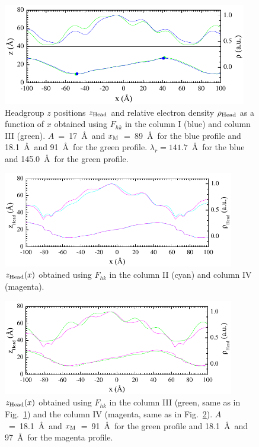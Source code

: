 \begin{figure}[htbp]
  \centering
  \includegraphics[width=0.95\textwidth]{figures/ripple/LAXS/low-res_comparison}
  \caption{Headgroup $z$ positions $z_\text{Head}$ and relative electron density
  $\rho_\text{Head}$ as a function of $x$ obtained 
  using $F_{hk}$ in the column I (blue) and column III (green).
  $A$~=~17~\AA\ and $x_\textrm{M}$~=~89~\AA\ for the blue profile and 18.1~\AA\ and 91~\AA\
  for the green profile.
  $\lambda_r = 141.7$~\AA\ for the blue and 145.0~\AA\ for the green profile.}
  \label{fig:low-res_comparison}
\end{figure}

\begin{figure}[htbp]
  \centering
  \includegraphics[width=0.9\textwidth]{figures/ripple/LAXS/un_vs_ori}
  \caption{$z_\text{Head}(x)$ obtained using $F_{hk}$ in the column II (cyan)
  and column IV (magenta).}
  \label{fig:un_vs_ori}
\end{figure}

\begin{figure}[htbp]
  \centering
  \includegraphics[width=0.9\textwidth]{figures/ripple/LAXS/high_vs_low}
  \caption{$z_\text{Head}(x)$ obtained using $F_{hk}$ in the column III (green, same as in Fig.~\ref{fig:low-res_comparison}) 
  and the column IV (magenta, same as in Fig.~\ref{fig:un_vs_ori}).
  $A$~=~18.1~\AA\ and $x_\textrm{M}$~=~91~\AA\ for the green profile and 18.1~\AA\ and 97~\AA\
  for the magenta profile.
  }
  \label{fig:high_vs_low}
\end{figure}

